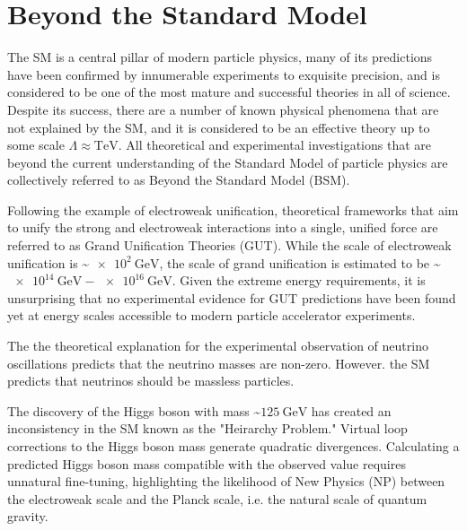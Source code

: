 \section{Beyond the Standard Model}
The SM is a central pillar of modern particle physics, many of its predictions have been confirmed by innumerable experiments to exquisite precision, and is considered to be one of the most mature and successful theories in all of science.
Despite its success, there are a number of known physical phenomena that are not explained by the SM, and it is considered to be an effective theory up to some scale $\Lambda \approx \si{\TeV}$.
All theoretical and experimental investigations that are beyond the current understanding of the Standard Model of particle physics are collectively referred to as Beyond the Standard Model (BSM).

Following the example of electroweak unification, theoretical frameworks that aim to unify the strong and electroweak interactions into a single, unified force are referred to as Grand Unification Theories (GUT).
While the scale of electroweak unification is \sim$\SI{e2}{\GeV}$, the scale of grand unification is estimated to be \sim$\SI{e14}{\GeV} - \SI{e16}{\GeV}$.
Given the extreme energy requirements, it is unsurprising that no experimental evidence for GUT predictions have been found yet at energy scales accessible to modern particle accelerator experiments.

The the theoretical explanation for the experimental observation of neutrino oscillations predicts that the neutrino masses are non-zero.
However. the SM predicts that neutrinos should be massless particles. 

The discovery of the Higgs boson with mass \sim$\SI{125}{\GeV}$ has created an inconsistency in the SM known as the "Heirarchy Problem."
Virtual loop corrections to the Higgs boson mass generate quadratic divergences.
Calculating a predicted Higgs boson mass compatible with the observed value requires unnatural fine-tuning, highlighting the likelihood of New Physics (NP) between the electroweak scale and the Planck scale, i.e. the natural scale of quantum gravity.

